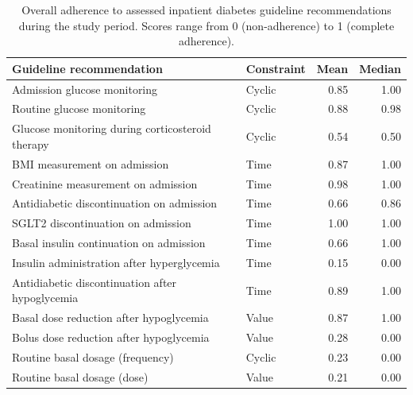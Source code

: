 \begin{table}[t]
\centering
\caption{Overall adherence to assessed inpatient diabetes guideline recommendations
during the study period. Scores range from 0 (non-adherence) to 1 (complete
adherence).}
\label{tab:overall-adherence}

\begin{tabularx}{\textwidth}{
>{\raggedright\arraybackslash}X
l
r
r
}
\toprule
Guideline recommendation & Constraint & Mean & Median \\
\midrule

Admission glucose monitoring
    & Cyclic & 0.85 & 1.00 \\

Routine glucose monitoring
    & Cyclic & 0.88 & 0.98 \\

Glucose monitoring during corticosteroid therapy
    & Cyclic & 0.54 & 0.50 \\

BMI measurement on admission
    & Time & 0.87 & 1.00 \\

Creatinine measurement on admission
    & Time & 0.98 & 1.00 \\

Antidiabetic discontinuation on admission
    & Time & 0.66 & 0.86 \\

SGLT2 discontinuation on admission
    & Time & 1.00 & 1.00 \\

Basal insulin continuation on admission
    & Time & 0.66 & 1.00 \\

Insulin administration after hyperglycemia
    & Time & 0.15 & 0.00 \\

Antidiabetic discontinuation after hypoglycemia
    & Time & 0.89 & 1.00 \\

Basal dose reduction after hypoglycemia
    & Value & 0.87 & 1.00 \\

Bolus dose reduction after hypoglycemia
    & Value & 0.28 & 0.00 \\

Routine basal dosage (frequency)
    & Cyclic & 0.23 & 0.00 \\

Routine basal dosage (dose)
    & Value & 0.21 & 0.00 \\

\bottomrule
\end{tabularx}
\end{table}


